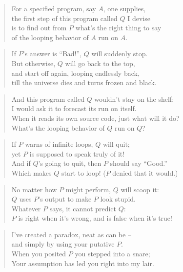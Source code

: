\begin{verse}
For a specified program, say \(A\), one supplies,\\
the first step of this program called \(Q\) I devise\\
is to find out from \(P\) what's the right thing to say\\
of the looping behavior of \(A\) run on \(A\).
\end{verse}
\begin{verse}
If \(P\)'s answer is ``Bad!'', \(Q\) will suddenly stop.\\
But otherwise, \(Q\) will go back to the top,\\
and start off again, looping endlessly back,\\
till the universe dies and turns frozen and black.
\end{verse}
\begin{verse}
And this program called \(Q\) wouldn't stay on the shelf;\\
I would ask it to forecast its run on itself.\\
When it reads its own source code, just what will it do?\\
What's the looping behavior of \(Q\) run on \(Q\)?
\end{verse}
\begin{verse}
If \(P\) warns of infinite loops, \(Q\) will quit;\\
yet \(P\) is supposed to speak truly of it!\\
And if \(Q\)'s going to quit, then \(P\) should say ``Good.''\\
Which makes \(Q\) start to loop! (\(P\) denied that it would.)
\end{verse}
\begin{verse}
No matter how \(P\) might perform, \(Q\) will scoop it:\\
\(Q\) uses \(P\)'s output to make \(P\) look stupid.\\
	Whatever \(P\) says, it cannot predict \(Q\):\\
\(P\) is right when it's wrong, and is false when it's true!
\end{verse}
\begin{verse}
I’ve created a paradox, neat as can be --\\
and simply by using your putative \(P\).\\
When you posited \(P\) you stepped into a snare;\\
Your assumption has led you right into my lair.
\end{verse}
